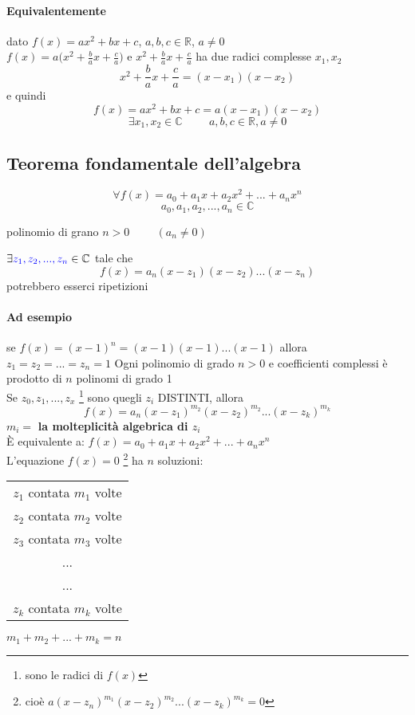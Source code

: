     \paragraph{Equivalentemente} dato $f(x)=ax^2+bx+c$, $a,b,c\in\mathbb{R}$, $a\neq 0 $\\
    $f(x)=a\Big( x^2+\frac{b}{a}x+\frac{c}{a}\Big)$ e $x^2+\frac{b}{a}x+\frac{c}{a}$ 
    ha due radici complesse $x_1, x_2$
    $$x^2+\frac{b}{a}x+\frac{c}{a}=(x-x_1)(x-x_2)$$
    e quindi 
    $$f(x)=ax^2+bx+c=a(x-x_1)(x-x_2)$$
    $$\exists x_1, x_2\in\mathbb{C}\hspace{1cm}a,b,c\in\mathbb{R}, a\neq 0$$
    \subsection{Teorema fondamentale dell'algebra}
    $$\forall f(x)=a_0+a_1x+a_2x^2+...+a_nx^n$$
    $$a_0, a_1,a_2,...,a_n\in\mathbb{C}$$
    \begin{center}
        polinomio di grano $n>0\hspace{1cm}(a_n\neq 0)$
    \end{center}
    $\exists {\color{blue}z_1, z_2,..., z_n} \in \mathbb{C}$ tale che 
    $$f(x)=a_n(x-z_1)(x-z_2)...(x-z_n)$$
    {\color{blue} potrebbero esserci ripetizioni}
    \paragraph{Ad esempio} se $f(x)=(x-1)^n=(x-1)(x-1)...(x-1)$ allora $z_1=z_2=...=z_n=1$
    {\color{red} Ogni polinomio di grado $n>0$ e coefficienti complessi è prodotto di $n$ 
    polinomi di grado 1}\\
    Se $z_0,z_1,...,z_x$ \footnote{sono le radici di $f(x)$} sono quegli $z_i$ DISTINTI, allora 
    $$f(x)=a_n(x-z_1)^{m_2}(x-z_2)^{m_2}...(x-z_k)^{m_k}$$
    {\color{red} $m_i=$ \textbf{la molteplicità algebrica di $z_i$}}\\
    È equivalente a: $f(x)=a_0+a_1x+a_2x^2+...+a_nx^n$\\
    L'equazione $f(x)=0$ \footnote{cioè $a(x-z_n)^{m_1}(x-z_2)^{m_2}...(x-z_k)^{m_k}=0$} 
    ha $n$ soluzioni:\\
    \begin{tabular}{c}
        $z_1$ contata $m_1$ volte\\
        $z_2$ contata $m_2$ volte\\
        $z_3$ contata $m_3$ volte\\
        ...\\
        ...\\
        $z_k$ contata $m_k$ volte\\
    \end{tabular} \hspace{1cm}
    {\color{red}$m_1+m_2+...+m_k=n$}
